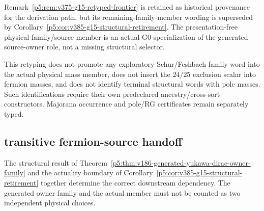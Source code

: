 \documentclass[12pt,a4paper]{article}
\begin{document}
\begin{remark}
\label{p5:rem:v385-g15-wording-superseded}
Remark~\ref{p5:rem:v375-g15-retyped-frontier} is retained as historical
provenance for the derivation path, but its remaining-family-member wording is
superseded by Corollary~\ref{p5:cor:v385-g15-structural-retirement}.  The
presentation-free physical family/source member is an actual G0 specialization
of the generated source-owner role, not a missing structural selector.
\end{remark}

\begin{remark}
\label{p5:rem:v385-no-diagnostic-promotion}
This retyping does not promote any exploratory Schur/Feshbach family word into
the actual physical mass member, does not insert the $24/25$ exclusion scalar
into fermion masses, and does not identify terminal structural words with pole
masses.  Such identifications require their own predeclared ancestry/cross-sort
constructors.  Majorana occurrence and pole/RG certificates remain separately
typed.
\end{remark}


\subsection{transitive fermion-source handoff}
\label{p5:sec:v387-transitive-fermion-source-handoff}

The structural result of Theorem~\ref{p5:thm:v186-generated-yukawa-dirac-owner-family}
and the actuality boundary of
Corollary~\ref{p5:cor:v385-g15-structural-retirement} together determine the
correct downstream dependency.  The generated owner family and the actual
member must not be counted as two independent physical choices.
\end{document}
